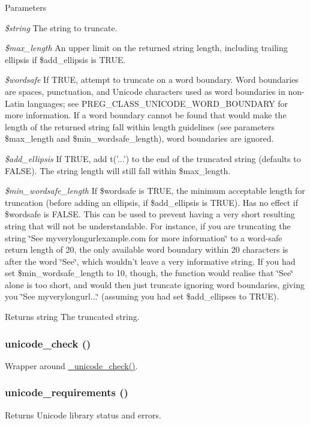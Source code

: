 \begin{DoxyParams}{Parameters}
\item[{\em \$string}]The string to truncate. \item[{\em \$max\_\-length}]An upper limit on the returned string length, including trailing ellipsis if \$add\_\-ellipsis is TRUE. \item[{\em \$wordsafe}]If TRUE, attempt to truncate on a word boundary. Word boundaries are spaces, punctuation, and Unicode characters used as word boundaries in non-\/Latin languages; see PREG\_\-CLASS\_\-UNICODE\_\-WORD\_\-BOUNDARY for more information. If a word boundary cannot be found that would make the length of the returned string fall within length guidelines (see parameters \$max\_\-length and \$min\_\-wordsafe\_\-length), word boundaries are ignored. \item[{\em \$add\_\-ellipsis}]If TRUE, add t('...') to the end of the truncated string (defaults to FALSE). The string length will still fall within \$max\_\-length. \item[{\em \$min\_\-wordsafe\_\-length}]If \$wordsafe is TRUE, the minimum acceptable length for truncation (before adding an ellipsis, if \$add\_\-ellipsis is TRUE). Has no effect if \$wordsafe is FALSE. This can be used to prevent having a very short resulting string that will not be understandable. For instance, if you are truncating the string \char`\"{}See myverylongurlexample.com for more information\char`\"{} to a word-\/safe return length of 20, the only available word boundary within 20 characters is after the word \char`\"{}See\char`\"{}, which wouldn't leave a very informative string. If you had set \$min\_\-wordsafe\_\-length to 10, though, the function would realise that \char`\"{}See\char`\"{} alone is too short, and would then just truncate ignoring word boundaries, giving you \char`\"{}See myverylongurl...\char`\"{} (assuming you had set \$add\_\-ellipses to TRUE).\end{DoxyParams}
\begin{DoxyReturn}{Returns}
string The truncated string. 
\end{DoxyReturn}
\hypertarget{unicode_8inc_a20a41302a4e02b802bd51c57935cef3a}{
\subsubsection[{unicode\_\-check}]{\setlength{\rightskip}{0pt plus 5cm}unicode\_\-check ()}}
\label{unicode_8inc_a20a41302a4e02b802bd51c57935cef3a}
Wrapper around \hyperlink{unicode_8inc_a8dd710941673e87ac38417d396622cba}{\_\-unicode\_\-check()}. \hypertarget{unicode_8inc_a4323fb60679302048119c2a43f780d3c}{
\subsubsection[{unicode\_\-requirements}]{\setlength{\rightskip}{0pt plus 5cm}unicode\_\-requirements ()}}
\label{unicode_8inc_a4323fb60679302048119c2a43f780d3c}
Returns Unicode library status and errors. 